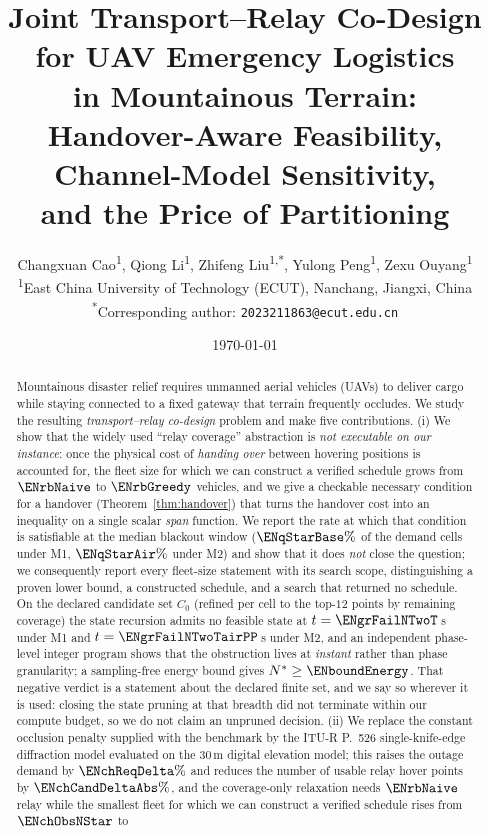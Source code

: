 \documentclass[11pt]{article}
\title{\bfseries Joint Transport--Relay Co-Design for UAV Emergency Logistics\\
in Mountainous Terrain:\\ Handover-Aware Feasibility, Channel-Model Sensitivity,\\
and the Price of Partitioning}
\author{Changxuan Cao\textsuperscript{1}, Qiong Li\textsuperscript{1},
Zhifeng Liu\textsuperscript{1,*}, Yulong Peng\textsuperscript{1}, Zexu Ouyang\textsuperscript{1}\\
\small \textsuperscript{1}East China University of Technology (ECUT), Nanchang, Jiangxi, China\\
\small \textsuperscript{*}Corresponding author: \texttt{2023211863@ecut.edu.cn}}
\date{\today}
\theoremstyle{dshplain}
\theoremstyle{dshdefn}
\begin{document}
\maketitle

\begin{abstract}
\noindent
Mountainous disaster relief requires unmanned aerial vehicles (UAVs) to deliver
cargo while staying connected to a fixed gateway that terrain frequently
occludes. We study the resulting \emph{transport--relay co-design} problem and
make five contributions.
(i) We show that the widely used ``relay coverage'' abstraction is
\emph{not executable on our instance}: once the physical cost of \emph{handing
over} between hovering positions is accounted for, the fleet size for which we can
construct a verified schedule grows from $\ENrbNaive$ to $\ENrbGreedy$ vehicles,
and we give a checkable necessary condition for a handover
(Theorem~\ref{thm:handover}) that turns the handover cost into an inequality on a
single scalar \emph{span} function. We report the rate at which that condition is
satisfiable at the median blackout window ($\ENqStarBase\%$ of the demand cells
under M1, $\ENqStarAir\%$ under M2) and show that it does
\emph{not} close the question; we consequently report every fleet-size statement
with its search scope, distinguishing a proven lower bound, a constructed
schedule, and a search that returned no schedule. On the declared candidate set
$C_0$ (refined per cell to the top-$12$ points by remaining coverage) the state
recursion admits no feasible state at $t=\ENgrFailNTwoT$\,s under M1 and
$t=\ENgrFailNTwoTairPP$\,s under M2, and an independent phase-level integer
program shows that the obstruction lives at \emph{instant} rather than phase
granularity; a sampling-free energy bound gives $N^{*}\ge\ENboundEnergy$. That
negative verdict is a statement about the declared finite set, and we say so
wherever it is used: closing the state pruning at that breadth did not terminate
within our compute budget, so we do not claim an unpruned decision.
(ii) We replace the constant occlusion penalty supplied with the benchmark by
the ITU-R P.~526 single-knife-edge diffraction model evaluated on the 30\,m
digital elevation model; this raises the outage demand by $\ENchReqDelta\%$ and
reduces the number of usable relay hover points by $\ENchCandDeltaAbs\%$, and the
coverage-only relaxation needs $\ENrbNaive$ relay while the smallest fleet
for which we can construct a verified schedule rises from $\ENchObsNStar$ to

\end{abstract}
\end{document}
